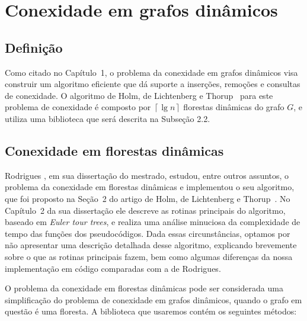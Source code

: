

\chapter{Conexidade em grafos dinâmicos}

\enlargethispage{.8\baselineskip}

\section{Definição}
\label{sec:definition}

Como citado no Capítulo~1, o problema da conexidade em grafos dinâmicos visa construir um algoritmo eficiente que dá suporte a inserções, remoções e consultas de conexidade. O algoritmo de Holm, de Lichtenberg e Thorup~\cite{jacob_holm} para este problema de conexidade é composto por $\left\lceil \lg n \right\rceil$ florestas dinâmicas do grafo $G$, e utiliza uma biblioteca que será descrita na Subseção 2.2. 

\section{Conexidade em florestas dinâmicas}
\label{sec:dynamic-forest-connectivity}

Rodrigues \cite{arthur}, em sua dissertação do mestrado, estudou, entre outros assuntos, o problema da conexidade em florestas dinâmicas e implementou o seu algoritmo, que foi proposto na Seção~2 do artigo de Holm, de Lichtenberg e Thorup~\cite{jacob_holm}. No Capítulo~2 da sua dissertação ele descreve as rotinas principais do algoritmo, baseado em \textit{Euler tour trees}, e realiza uma análise minuciosa da complexidade de tempo das funções dos pseudocódigos. Dada essas circunstâncias, optamos por não apresentar uma descrição detalhada desse algoritmo, explicando brevemente sobre o que as rotinas principais fazem, bem como algumas diferenças da nossa implementação em código comparadas com a de Rodrigues.  

O problema da conexidade em florestas dinâmicas pode ser considerada uma simplificação do problema de conexidade em grafos dinâmicos, quando o grafo em questão é uma floresta. A biblioteca que usaremos contém os seguintes métodos:

